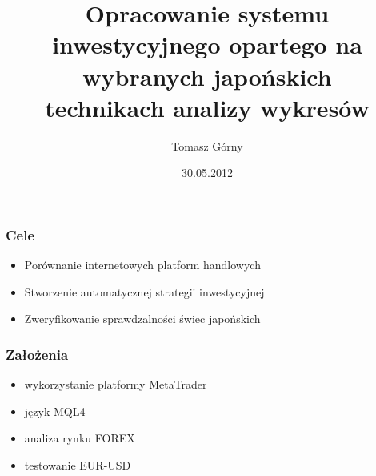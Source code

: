\documentclass{beamer}
\title[Praca magisterska]{Opracowanie systemu inwestycyjnego opartego na wybranych japońskich \\technikach analizy wykresów}
\author[T. Górny]{Tomasz Górny}
\date[2012]{30.05.2012}
\institute[AGH]
{Wydział EAIiE\\ 
Katedra Automatyki
}
\begin{document}
{
 \begin{frame}
   \titlepage
 \end{frame}
}


\begin{frame}
\frametitle{Cele}

\begin{itemize}

\item Porównanie internetowych platform handlowych
\item Stworzenie automatycznej strategii inwestycyjnej
\item Zweryfikowanie sprawdzalności świec japońskich

\end{itemize}

\end{frame}



\begin{frame}
\frametitle{Założenia}

\begin{itemize}

\item wykorzystanie platformy MetaTrader
\item język MQL4
\item analiza rynku FOREX
\item testowanie EUR-USD

\end{itemize}

\end{frame}
\end{document}
